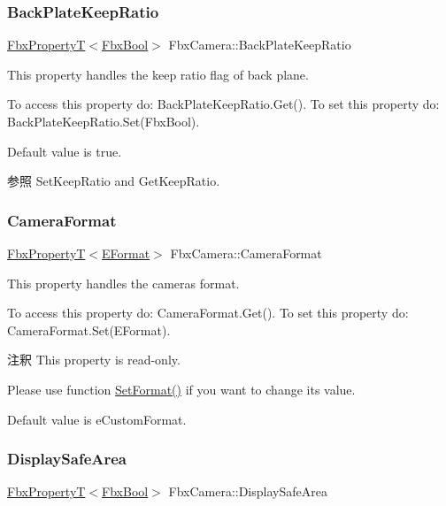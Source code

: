 \subsubsection{\texorpdfstring{Back\+Plate\+Keep\+Ratio}{BackPlateKeepRatio}}
{\footnotesize\ttfamily \hyperlink{class_fbx_property_t}{Fbx\+PropertyT}$<$\hyperlink{fbxtypes_8h_a92e0562b2fe33e76a242f498b362262e}{Fbx\+Bool}$>$ Fbx\+Camera\+::\+Back\+Plate\+Keep\+Ratio}

This property handles the keep ratio flag of back plane.

To access this property do\+: Back\+Plate\+Keep\+Ratio.\+Get(). To set this property do\+: Back\+Plate\+Keep\+Ratio.\+Set(\+Fbx\+Bool).

Default value is true. \begin{DoxySeeAlso}{参照}
Set\+Keep\+Ratio and Get\+Keep\+Ratio. 
\end{DoxySeeAlso}
\mbox{\label{class_fbx_camera_aa597919c9a693becd2647b969604e401}} 
\subsubsection{\texorpdfstring{Camera\+Format}{CameraFormat}}
{\footnotesize\ttfamily \hyperlink{class_fbx_property_t}{Fbx\+PropertyT}$<$\hyperlink{class_fbx_camera_a88d68c983d21e4d6c0f281a8a30f0a06}{E\+Format}$>$ Fbx\+Camera\+::\+Camera\+Format}

This property handles the camera\textquotesingle{}s format.

To access this property do\+: Camera\+Format.\+Get(). To set this property do\+: Camera\+Format.\+Set(\+E\+Format).

\begin{DoxyRemark}{注釈}
This property is read-\/only. 

Please use function \hyperlink{class_fbx_camera_a49db13fb34e3cfa618823e61511f5312}{Set\+Format()} if you want to change its value.
\end{DoxyRemark}
Default value is e\+Custom\+Format. \mbox{\label{class_fbx_camera_a61d982bee729eae989b1c4f49e53ef59}} 
\subsubsection{\texorpdfstring{Display\+Safe\+Area}{DisplaySafeArea}}
{\footnotesize\ttfamily \hyperlink{class_fbx_property_t}{Fbx\+PropertyT}$<$\hyperlink{fbxtypes_8h_a92e0562b2fe33e76a242f498b362262e}{Fbx\+Bool}$>$ Fbx\+Camera\+::\+Display\+Safe\+Area}

